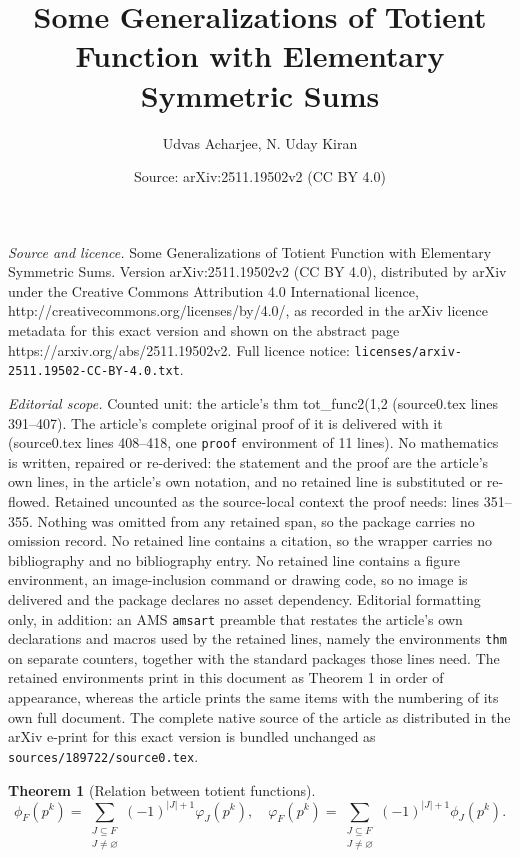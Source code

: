 \documentclass[10pt,a4paper]{amsart}
\title{Some Generalizations of Totient Function with Elementary Symmetric Sums}
\author{Udvas Acharjee, N. Uday Kiran}
\date{Source: arXiv:2511.19502v2 (CC BY 4.0)}
\newtheorem{thm}{Theorem}
\begin{document}
\maketitle

\noindent\emph{Source and licence.} Some Generalizations of Totient Function with Elementary Symmetric Sums. Version arXiv:2511.19502v2 (CC BY 4.0), distributed by arXiv under the Creative Commons Attribution 4.0 International licence, http://creativecommons.org/licenses/by/4.0/, as recorded in the arXiv licence metadata for this exact version and shown on the abstract page https://arxiv.org/abs/2511.19502v2. Full licence notice: \texttt{licenses/arxiv-2511.19502-CC-BY-4.0.txt}.\par\smallskip

\noindent\textit{Editorial scope.} Counted unit: the article's thm tot\_func2(1,2 (source0.tex lines 391--407). The article's complete original proof of it is delivered with it (source0.tex lines 408--418, one \texttt{proof} environment of 11 lines). No mathematics is written, repaired or re-derived: the statement and the proof are the article's own lines, in the article's own notation, and no retained line is substituted or re-flowed.  Retained uncounted as the source-local context the proof needs: lines 351--355.  Nothing was omitted from any retained span, so the package carries no omission record.  No retained line contains a citation, so the wrapper carries no bibliography and no bibliography entry.  No retained line contains a figure environment, an image-inclusion command or drawing code, so no image is delivered and the package declares no asset dependency.  Editorial formatting only, in addition: an AMS \texttt{amsart} preamble that restates the article's own declarations and macros used by the retained lines, namely the environments \texttt{thm} on separate counters, together with the standard packages those lines need.  The retained environments print in this document as Theorem 1 in order of appearance, whereas the article prints the same items with the numbering of its own full document.  The complete native source of the article as distributed in the arXiv e-print for this exact version is bundled unchanged as \texttt{sources/189722/source0.tex}.
\begin{thm}[Relation between totient functions]\label{thm: relation_tot}
\[
\phi_F(p^k)=\sum_{\substack{J \subseteq F \\ J \ne \varnothing}}(-1)^{|J|+1}\varphi_J(p^k), \quad \varphi_F(p^k)=\sum_{\substack{J \subseteq F \\ J \ne \varnothing}}(-1)^{|J|+1}\phi_J(p^k).
\]
\end{thm}
\end{document}

